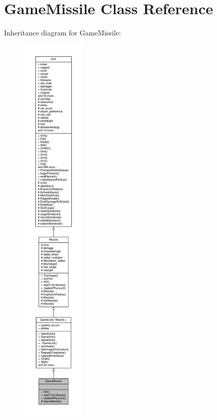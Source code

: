 \hypertarget{classGameMissile}{}\section{Game\+Missile Class Reference}
\label{classGameMissile}


Inheritance diagram for Game\+Missile\+:
\nopagebreak
\begin{figure}[H]
\begin{center}
\leavevmode
\includegraphics[height=550pt]{dc/d5b/classGameMissile__inherit__graph}
\end{center}
\end{figure}


